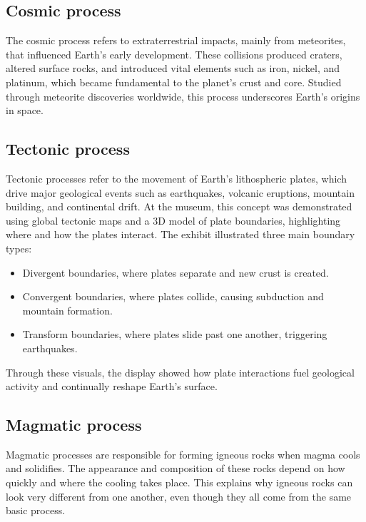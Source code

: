 \subsection{Cosmic process}
\label{subsec:cosmic-process}

The cosmic process refers to extraterrestrial impacts, mainly from meteorites, that influenced Earth's early development. These collisions produced craters, altered surface rocks, and introduced vital elements such as iron, nickel, and platinum, which became fundamental to the planet's crust and core. Studied through meteorite discoveries worldwide, this process underscores Earth's origins in space.

\subsection{Tectonic process}
\label{subsec:tectonic-process}

Tectonic processes refer to the movement of Earth's lithospheric plates, which drive major geological events such as earthquakes, volcanic eruptions, mountain building, and continental drift. At the museum, this concept was demonstrated using global tectonic maps and a 3D model of plate boundaries, highlighting where and how the plates interact. The exhibit illustrated three main boundary types:

\begin{itemize}
  \item Divergent boundaries, where plates separate and new crust is created.
  \item Convergent boundaries, where plates collide, causing subduction and mountain formation.
  \item Transform boundaries, where plates slide past one another, triggering earthquakes.
\end{itemize}

Through these visuals, the display showed how plate interactions fuel geological activity and continually reshape Earth's surface.

\subsection{Magmatic process}
\label{subsec:magmatic-process}

Magmatic processes are responsible for forming igneous rocks when magma cools and solidifies. The appearance and composition of these rocks depend on how quickly and where the cooling takes place. This explains why igneous rocks can look very different from one another, even though they all come from the same basic process.

